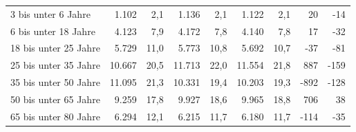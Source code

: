 \documentclass[
  a4paper,
  twoside]{article}
\begin{document}
\begin{table}[H]
{\begin{threeparttable}
\begin{tabular}[t]{>{}l>{}r>{}r>{}r>{}r>{}r>{}r>{}r>{}r}
\hspace{1em}\hspace{1em}\textcolor{DoGray}{3 bis unter 6 Jahre} & \textcolor{DoGray}{1.102} & \textcolor{DoGray}{2,1} & \textcolor{DoGray}{1.136} & \textcolor{DoGray}{2,1} & \textcolor{DoGray}{1.122} & \textcolor{DoGray}{2,1} & \textcolor{DoGray}{20} & \textcolor{DoGray}{-14}\\
\hspace{1em}\hspace{1em}\textcolor{DoGray}{6 bis unter 18 Jahre} & \textcolor{DoGray}{4.123} & \textcolor{DoGray}{7,9} & \textcolor{DoGray}{4.172} & \textcolor{DoGray}{7,8} & \textcolor{DoGray}{4.140} & \textcolor{DoGray}{7,8} & \textcolor{DoGray}{17} & \textcolor{DoGray}{-32}\\
\hspace{1em}\hspace{1em}\textcolor{DoGray}{18 bis unter 25 Jahre} & \textcolor{DoGray}{5.729} & \textcolor{DoGray}{11,0} & \textcolor{DoGray}{5.773} & \textcolor{DoGray}{10,8} & \textcolor{DoGray}{5.692} & \textcolor{DoGray}{10,7} & \textcolor{DoGray}{-37} & \textcolor{DoGray}{-81}\\
\hspace{1em}\hspace{1em}\textcolor{DoGray}{25 bis unter 35 Jahre} & \textcolor{DoGray}{10.667} & \textcolor{DoGray}{20,5} & \textcolor{DoGray}{11.713} & \textcolor{DoGray}{22,0} & \textcolor{DoGray}{11.554} & \textcolor{DoGray}{21,8} & \textcolor{DoGray}{887} & \textcolor{DoGray}{-159}\\
\hspace{1em}\hspace{1em}\textcolor{DoGray}{35 bis unter 50 Jahre} & \textcolor{DoGray}{11.095} & \textcolor{DoGray}{21,3} & \textcolor{DoGray}{10.331} & \textcolor{DoGray}{19,4} & \textcolor{DoGray}{10.203} & \textcolor{DoGray}{19,3} & \textcolor{DoGray}{-892} & \textcolor{DoGray}{-128}\\
\hspace{1em}\hspace{1em}\textcolor{DoGray}{50 bis unter 65 Jahre} & \textcolor{DoGray}{9.259} & \textcolor{DoGray}{17,8} & \textcolor{DoGray}{9.927} & \textcolor{DoGray}{18,6} & \textcolor{DoGray}{9.965} & \textcolor{DoGray}{18,8} & \textcolor{DoGray}{706} & \textcolor{DoGray}{38}\\
\hspace{1em}\hspace{1em}\textcolor{DoGray}{65 bis unter 80 Jahre} & \textcolor{DoGray}{6.294} & \textcolor{DoGray}{12,1} & \textcolor{DoGray}{6.215} & \textcolor{DoGray}{11,7} & \textcolor{DoGray}{6.180} & \textcolor{DoGray}{11,7} & \textcolor{DoGray}{-114} & \textcolor{DoGray}{-35}\\

\end{tabular}
\end{threeparttable}}
\end{table}
\end{document}

